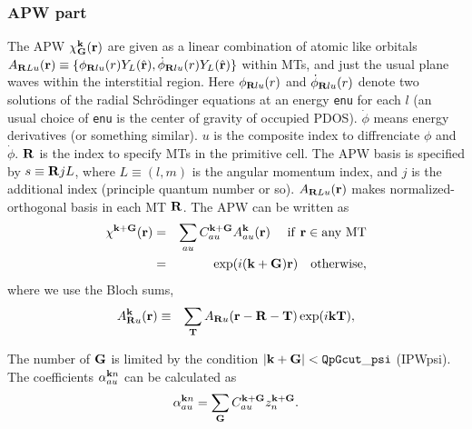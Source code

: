 \documentclass[a4paper,10pt,epsf,fleqn]{article}
\newcommand{\bfG}{{\bf G}}
\newcommand{\bfR}{{\bf R}}
\begin{document}
\subsubsection{ APW part}
The APW $\chi^{{\bf k}}_\bfG({\bf r})$ are 
given as a linear combination of atomic like orbitals
\noindent $A_{\bfR{Lu}}({\bf r})\equiv 
\{ \phi_{\bfR{l}u}(r) Y_L(\hat{\bf r}),
    \dot{\phi}_{\bfR{l}u}(r) Y_L(\hat{\bf r}) \}$
within MTs, and just the usual plane waves 
within the interstitial region. Here
$\phi_{\bfR{l}u}(r)$ and $\dot{\phi}_{\bfR{l}u}(r)$ 
denote two solutions of
the radial Schr\"odinger equations at an energy \verb#enu# 
for each $l$ (an usual choice of \verb#enu# is the center of 
gravity of occupied PDOS). $\dot{\phi}$ means energy derivatives
(or something similar).
$u$ is the composite index
to diffrenciate $\phi$ and $\dot{\phi}$.
$\bfR$ is the index to specify MTs in the primitive cell.
The APW basis is specified by $s \equiv {\bfR{j}L}$, where
$L\equiv(l,m)$ is the angular momentum index, 
and $j$ is the additional index (principle quantum number or so). 
$A_{\bfR{L}u}({\bf r})$ makes normalized-orthogonal basis in
each MT $\bfR$.
The APW can be written as
\begin{eqnarray}
\label{coeff}
\chi^{\bf k+G}({\bf r}) &=& \sum_{a u} C^{\bf k+G}_{a u} A^{\bf k}_{a u}({\bf r})   \ \ \ {\rm \ if \ {\bf r} \in any \ MT} \nonumber \\
        &=&   \exp(i ({\bf k+G}){\bf r}) \ \ \ {\rm otherwise},
\end{eqnarray}
where we use the Bloch sums,
\begin{eqnarray}
A^{\bf k}_{\bfR u}({\bf r}) &\equiv& \sum_{\bf T} 
A_{\bfR u}({\bf r-R-T}) \exp(i {\bf kT}),
\end{eqnarray}

The number of ${\bf G}$ is limited by the condition
$|{\bf k+G}|< {\tt QpGcut\_psi}$ (IPWpsi).
The coefficients $\alpha^{{\bf k}n}_{au}$ can be calculated as
\begin{eqnarray}
\alpha^{{\bf k}n}_{au} = \sum_{\bf G} C^{{\bf k+G}}_{a u} z^{\bf k+G}_n.
\end{eqnarray}
\end{document}
